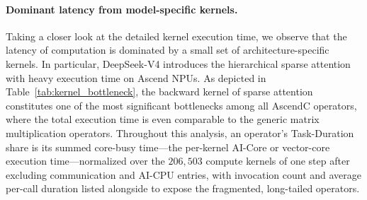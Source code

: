 


\paragraph{Dominant latency from model-specific kernels.}
Taking a closer look at the detailed kernel execution time, we observe that the latency of computation is dominated by a small set of architecture-specific kernels.
In particular, DeepSeek-V4 introduces the hierarchical sparse attention with heavy execution time on Ascend NPUs.
As depicted in Table~\ref{tab:kernel_bottleneck}, the backward kernel of sparse attention constitutes one of the most significant bottlenecks among all AscendC operators, where the total execution time is even comparable to the generic matrix multiplication operators. Throughout this analysis, an operator's Task-Duration share is its summed core-busy time---the per-kernel AI-Core or vector-core execution time---normalized over the $206{,}503$ compute kernels of one step after excluding communication and AI-CPU entries, with invocation count and average per-call duration listed alongside to expose the fragmented, long-tailed operators.

